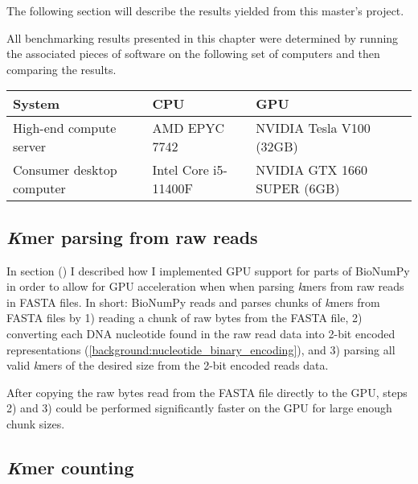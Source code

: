 The following section will describe the results yielded from this master's project.

All benchmarking results presented in this chapter were determined by running the associated pieces of software on the following set of computers and then comparing the results.

\begin{center}
  \begin{tabular}{lll}
    \hline
      System                    & CPU                  & GPU                           \\
    \hline
      High-end compute server   & AMD EPYC 7742        & NVIDIA Tesla V100  (32GB)     \\
      Consumer desktop computer & Intel Core i5-11400F & NVIDIA GTX 1660 SUPER (6GB)   \\
    \hline
  \end{tabular}
\end{center}

\subsection{\textit{K}mer parsing from raw reads}
In section () I described how I implemented GPU support for parts of BioNumPy \cite{bionumpy} in order to allow for GPU acceleration when when parsing \textit{k}mers from raw reads in FASTA files.
In short: BioNumPy reads and parses chunks of \textit{k}mers from FASTA files by 
1) reading a chunk of raw bytes from the FASTA file, 
2) converting each DNA nucleotide found in the raw read data into 2-bit encoded representations (\ref{background:nucleotide_binary_encoding}), 
and 3) parsing all valid \textit{k}mers of the desired size from the 2-bit encoded reads data.

After copying the raw bytes read from the FASTA file directly to the GPU, steps 2) and 3) could be performed significantly faster on the GPU for large enough chunk sizes.

\subsection{\textit{K}mer counting}

